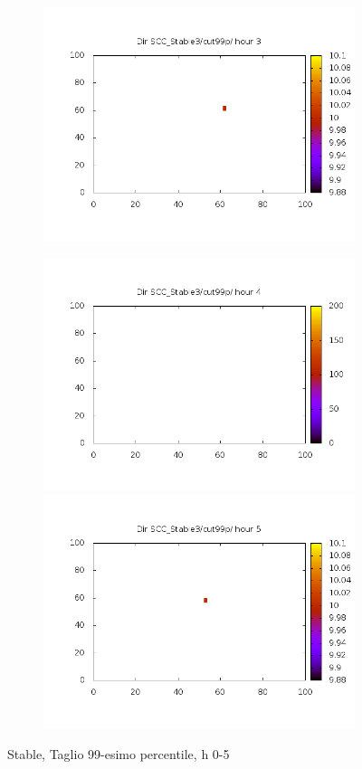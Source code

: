 \documentclass[10pt,a4paper]{article}
\begin{document}
\begin{figure}
\begin{subfigure}[b]{1\textwidth}
\includegraphics[scale=.4]{./img/SCC_Stable3/cut99p/3.png}
\end{subfigure}
\begin{subfigure}[b]{1\textwidth}
\includegraphics[scale=.4]{./img/SCC_Stable3/cut99p/4.png}
\includegraphics[scale=.4]{./img/SCC_Stable3/cut99p/5.png}
\end{subfigure}
\caption{Stable, Taglio 99-esimo percentile, h 0-5}
\label{stable-99-05}
\end{figure}
\end{document}
